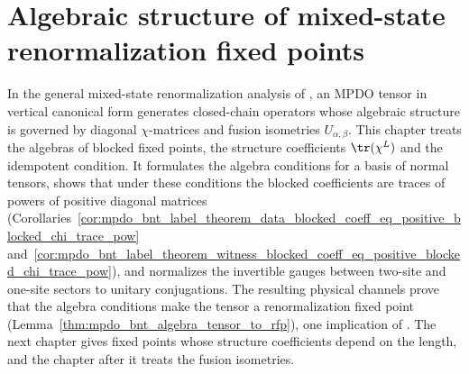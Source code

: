 \chapter{Algebraic structure of mixed-state renormalization fixed points}%
\label{ch:mpdo_rfp_algebraic}

In the general mixed-state renormalization analysis of
\cite[Section~4]{Cirac2016MPDO_arXiv}, an MPDO tensor in vertical canonical form
generates closed-chain operators whose algebraic structure is governed by
diagonal $\chi$-matrices and fusion isometries $U_{\alpha,\beta}$. This
chapter treats the algebras of blocked fixed points, the structure
coefficients $\tr(\chi^L)$ and the idempotent condition. It formulates the
algebra conditions for a basis of normal tensors, shows that under these
conditions the blocked coefficients are traces of powers of positive diagonal
matrices
(Corollaries~\ref{cor:mpdo_bnt_label_theorem_data_blocked_coeff_eq_positive_blocked_chi_trace_pow}
and~\ref{cor:mpdo_bnt_label_theorem_witness_blocked_coeff_eq_positive_blocked_chi_trace_pow}),
and normalizes the invertible gauges between two-site and one-site sectors
to unitary conjugations. The resulting physical channels prove that the
algebra conditions make the tensor a renormalization fixed point
(Lemma~\ref{thm:mpdo_bnt_algebra_tensor_to_rfp}), one implication of
\cite[Theorem~4.14]{Cirac2016MPDO_arXiv}. The next chapter gives fixed points
whose structure coefficients depend on the length, and the chapter after it
treats the fusion isometries.


